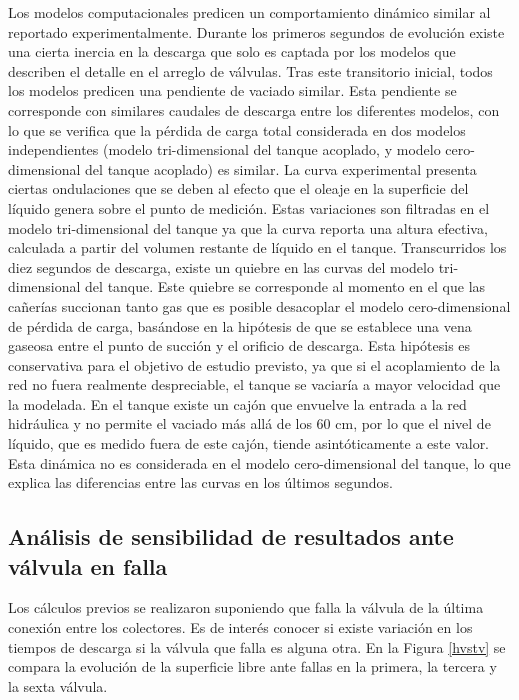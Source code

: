 Los modelos computacionales predicen un comportamiento dinámico similar al reportado experimentalmente.
Durante los primeros segundos de evolución existe una cierta inercia en la descarga que solo es captada por los modelos que describen el detalle en el arreglo de válvulas.
Tras este transitorio inicial, todos los modelos predicen una pendiente de vaciado similar.
Esta pendiente se corresponde con similares caudales de descarga entre los diferentes modelos, 
con lo que se verifica que la pérdida de carga total considerada en dos modelos independientes (modelo tri-dimensional del tanque acoplado, y modelo cero-dimensional del tanque acoplado) es similar.
La curva experimental presenta ciertas ondulaciones que se deben al efecto que el oleaje en la superficie del líquido genera sobre el punto de medición.
Estas variaciones son filtradas en el modelo tri-dimensional del tanque ya que la curva reporta una altura efectiva, calculada a partir del volumen restante de líquido en el tanque.
Transcurridos los diez segundos de descarga, existe un quiebre en las curvas del modelo tri-dimensional del tanque.
Este quiebre se corresponde al momento en el que las cañerías succionan tanto gas que es posible desacoplar el modelo cero-dimensional de pérdida de carga,
basándose en la hipótesis de que se establece una vena gaseosa entre el punto de succión y el orificio de descarga.
Esta hipótesis es conservativa para el objetivo de estudio previsto,
ya que si el acoplamiento de la red no fuera realmente despreciable, el tanque se vaciaría a mayor velocidad que la modelada.
En el tanque existe un cajón que envuelve la entrada a la red hidráulica y no permite el vaciado más allá de los 60 cm,
por lo que el nivel de líquido, que es medido fuera de este cajón, tiende asintóticamente a este valor.
Esta dinámica no es considerada en el modelo cero-dimensional del tanque, lo que explica las diferencias entre las curvas en los últimos segundos.

\subsection*{Análisis de sensibilidad de resultados ante válvula en falla}

Los cálculos previos se realizaron suponiendo que falla la válvula de la última conexión entre los colectores.
Es de interés conocer si existe variación en los tiempos de descarga si la válvula que falla es alguna otra.
En la Figura \ref{hvstv} se compara la evolución de la superficie libre ante fallas en la primera, la tercera y la sexta válvula.

